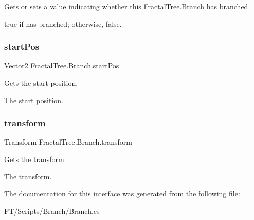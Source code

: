 Gets or sets a value indicating whether this \hyperlink{interface_fractal_tree_1_1_branch}{Fractal\+Tree.\+Branch} has branched. 

{\ttfamily true} if has branched; otherwise, {\ttfamily false}.\mbox{\label{interface_fractal_tree_1_1_branch_a52b6d474fb483fb9e37e1c3fb8407ac5}} 
\subsubsection{\texorpdfstring{start\+Pos}{startPos}}
{\footnotesize\ttfamily Vector2 Fractal\+Tree.\+Branch.\+start\+Pos\hspace{0.3cm}{\ttfamily [get]}}



Gets the start position. 

The start position.\mbox{\label{interface_fractal_tree_1_1_branch_a4063cbfa57dfa91075a67c124ae3a3ac}} 
\subsubsection{\texorpdfstring{transform}{transform}}
{\footnotesize\ttfamily Transform Fractal\+Tree.\+Branch.\+transform\hspace{0.3cm}{\ttfamily [get]}}



Gets the transform. 

The transform.

The documentation for this interface was generated from the following file\+:\begin{DoxyCompactItemize}
\item 
F\+T/\+Scripts/\+Branch/Branch.\+cs\end{DoxyCompactItemize}
